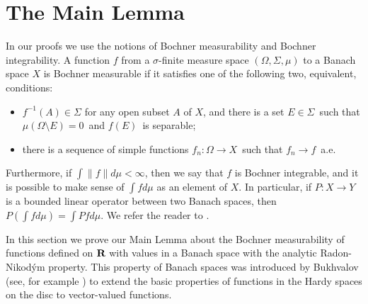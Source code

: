\section{The Main Lemma}
\newtheorem{defarnp}{Definition}[section]
\newtheorem{essbound}[defarnp]{Lemma}
\newtheorem{mainlemma}[defarnp]{Main Lemma}
\newtheorem{cormainlemma}[defarnp]{Theorem}
\newtheorem{riesz1}[defarnp]{Theorem}
\newtheorem{propertyofg}[defarnp]{Theorem}
In our proofs we use the notions of Bochner measurability
and Bochner integrability.  A function $f$ from a $\sigma$-finite
measure space $(\Omega,\Sigma,\mu)$
to a Banach space $X$ is Bochner measurable if it satisfies one of the
following two, equivalent, conditions:
\begin{itemize}
\item
$f^{-1}(A)\in\Sigma$ for any open subset $A$ of $X$, and there is a
set $E \in \Sigma$\ such that $\mu(\Omega\setminus E) = 0$\ and $f(E)$\
is separable;
\item
there is a sequence of simple functions $f_n:\Omega\to X$\ such that
$f_n \to f$\ a.e.
\end{itemize}
Furthermore, if $\int \| f \| d\mu < \infty$, then we say that $f$
is Bochner integrable, and it is possible
to make sense of $\int f d\mu $ as an element of $X$.  In particular,
if $P:X\to Y$ is a bounded 
linear operator between two Banach spaces, then
$P\left(\int f d\mu\right) = \int Pf d\mu$.
We refer the reader to \cite[Section 3.5]{hp}.

In this section we prove our Main Lemma about
the Bochner measurability of functions
defined on $\R$ with values in a Banach space with the
analytic Radon-Nikod\'ym property.
This property of Banach spaces was introduced by
Bukhvalov (see, for example \cite{bukh}) to extend
the basic properties of functions in the Hardy spaces on the disc
to vector-valued functions.  

